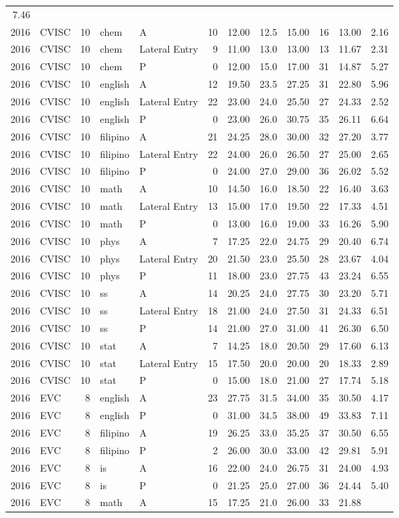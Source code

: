 \documentclass[]{article}
\begin{document}
\begin{longtable}[]{@{}rlrllrrrrrrr@{}}
7.46\tabularnewline
2016 & CVISC & 10 & chem & A & 10 & 12.00 & 12.5 & 15.00 & 16 & 13.00 &
2.16\tabularnewline
2016 & CVISC & 10 & chem & Lateral Entry & 9 & 11.00 & 13.0 & 13.00 & 13
& 11.67 & 2.31\tabularnewline
2016 & CVISC & 10 & chem & P & 0 & 12.00 & 15.0 & 17.00 & 31 & 14.87 &
5.27\tabularnewline
2016 & CVISC & 10 & english & A & 12 & 19.50 & 23.5 & 27.25 & 31 & 22.80
& 5.96\tabularnewline
2016 & CVISC & 10 & english & Lateral Entry & 22 & 23.00 & 24.0 & 25.50
& 27 & 24.33 & 2.52\tabularnewline
2016 & CVISC & 10 & english & P & 0 & 23.00 & 26.0 & 30.75 & 35 & 26.11
& 6.64\tabularnewline
2016 & CVISC & 10 & filipino & A & 21 & 24.25 & 28.0 & 30.00 & 32 &
27.20 & 3.77\tabularnewline
2016 & CVISC & 10 & filipino & Lateral Entry & 22 & 24.00 & 26.0 & 26.50
& 27 & 25.00 & 2.65\tabularnewline
2016 & CVISC & 10 & filipino & P & 0 & 24.00 & 27.0 & 29.00 & 36 & 26.02
& 5.52\tabularnewline
2016 & CVISC & 10 & math & A & 10 & 14.50 & 16.0 & 18.50 & 22 & 16.40 &
3.63\tabularnewline
2016 & CVISC & 10 & math & Lateral Entry & 13 & 15.00 & 17.0 & 19.50 &
22 & 17.33 & 4.51\tabularnewline
2016 & CVISC & 10 & math & P & 0 & 13.00 & 16.0 & 19.00 & 33 & 16.26 &
5.90\tabularnewline
2016 & CVISC & 10 & phys & A & 7 & 17.25 & 22.0 & 24.75 & 29 & 20.40 &
6.74\tabularnewline
2016 & CVISC & 10 & phys & Lateral Entry & 20 & 21.50 & 23.0 & 25.50 &
28 & 23.67 & 4.04\tabularnewline
2016 & CVISC & 10 & phys & P & 11 & 18.00 & 23.0 & 27.75 & 43 & 23.24 &
6.55\tabularnewline
2016 & CVISC & 10 & ss & A & 14 & 20.25 & 24.0 & 27.75 & 30 & 23.20 &
5.71\tabularnewline
2016 & CVISC & 10 & ss & Lateral Entry & 18 & 21.00 & 24.0 & 27.50 & 31
& 24.33 & 6.51\tabularnewline
2016 & CVISC & 10 & ss & P & 14 & 21.00 & 27.0 & 31.00 & 41 & 26.30 &
6.50\tabularnewline
2016 & CVISC & 10 & stat & A & 7 & 14.25 & 18.0 & 20.50 & 29 & 17.60 &
6.13\tabularnewline
2016 & CVISC & 10 & stat & Lateral Entry & 15 & 17.50 & 20.0 & 20.00 &
20 & 18.33 & 2.89\tabularnewline
2016 & CVISC & 10 & stat & P & 0 & 15.00 & 18.0 & 21.00 & 27 & 17.74 &
5.18\tabularnewline
2016 & EVC & 8 & english & A & 23 & 27.75 & 31.5 & 34.00 & 35 & 30.50 &
4.17\tabularnewline
2016 & EVC & 8 & english & P & 0 & 31.00 & 34.5 & 38.00 & 49 & 33.83 &
7.11\tabularnewline
2016 & EVC & 8 & filipino & A & 19 & 26.25 & 33.0 & 35.25 & 37 & 30.50 &
6.55\tabularnewline
2016 & EVC & 8 & filipino & P & 2 & 26.00 & 30.0 & 33.00 & 42 & 29.81 &
5.91\tabularnewline
2016 & EVC & 8 & is & A & 16 & 22.00 & 24.0 & 26.75 & 31 & 24.00 &
4.93\tabularnewline
2016 & EVC & 8 & is & P & 0 & 21.25 & 25.0 & 27.00 & 36 & 24.44 &
5.40\tabularnewline
2016 & EVC & 8 & math & A & 15 & 17.25 & 21.0 & 26.00 & 33 & 21.88 &

\end{longtable}
\end{document}
